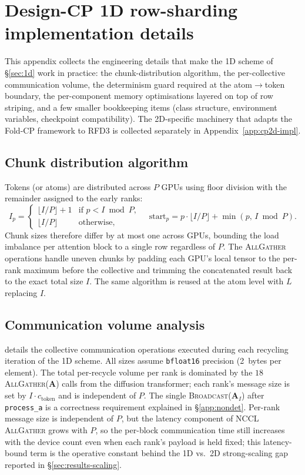 \documentclass{article}
\theoremstyle{plain}
\theoremstyle{definition}
\theoremstyle{remark}
\begin{document}
\section{Design-CP 1D row-sharding implementation details}
\label{app:impl-parent}
\label{app:1d-impl}

This appendix collects the engineering details that make the 1D scheme of \S\ref{sec:1d} work in practice: the chunk-distribution algorithm, the per-collective communication volume, the determinism guard required at the atom$\to$token boundary, the per-component memory optimisations layered on top of row striping, and a few smaller bookkeeping items (class structure, environment variables, checkpoint compatibility). The 2D-specific machinery that adapts the Fold-CP framework to RFD3 is collected separately in Appendix~\ref{app:cp2d-impl}.

\subsection{Chunk distribution algorithm}
\label{app:chunk}

Tokens (or atoms) are distributed across $P$ GPUs using floor division with the remainder assigned to the early ranks:
\begin{equation}
I_p =
\begin{cases}
\lfloor I/P \rfloor + 1 & \text{if } p < I \bmod P, \\
\lfloor I/P \rfloor     & \text{otherwise},
\end{cases}
\quad
\text{start}_p = p \cdot \lfloor I/P \rfloor + \min(p,\, I \bmod P).
\end{equation}
Chunk sizes therefore differ by at most one across GPUs, bounding the load imbalance per attention block to a single row regardless of $P$. The \textsc{AllGather} operations handle uneven chunks by padding each GPU's local tensor to the per-rank maximum before the collective and trimming the concatenated result back to the exact total size $I$. The same algorithm is reused at the atom level with $L$ replacing $I$.

\subsection{Communication volume analysis}
\label{app:communication}

 details the collective communication operations executed during each recycling iteration of the 1D scheme. All sizes assume \texttt{bfloat16} precision (2~bytes per element). The total per-recycle volume per rank is dominated by the $18$ \textsc{AllGather}($\mathbf{A}$) calls from the diffusion transformer; each rank's message size is set by $I\cdot c_\text{token}$ and is independent of $P$. The single \textsc{Broadcast}($\mathbf{A}_I$) after \texttt{process\_a} is a correctness requirement explained in \S\ref{app:nondet}. Per-rank message size is independent of $P$, but the latency component of NCCL \textsc{AllGather} grows with $P$, so the per-block communication time still increases with the device count even when each rank's payload is held fixed; this latency-bound term is the operative constant behind the 1D vs.\ 2D strong-scaling gap reported in \S\ref{sec:results-scaling}.
\end{document}

